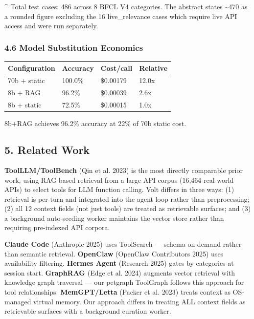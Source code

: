 \documentclass[
  10pt,
]{article}
\begin{document}
\^{} Total test cases: 486 across 8 BFCL V4 categories. The abstract
states \textasciitilde470 as a rounded figure excluding the 16
live\_relevance cases which require live API access and were run
separately.

\subsubsection{4.6 Model Substitution
Economics}\label{model-substitution-economics}

\begin{longtable}[]{@{}llll@{}}
\toprule\noalign{}
Configuration & Accuracy & Cost/call & Relative \\
\midrule\noalign{}
\endhead
\bottomrule\noalign{}
\endlastfoot
70b + static & 100.0\% & \$0.00179 & 12.0x \\
8b + RAG & 96.2\% & \$0.00039 & 2.6x \\
8b + static & 72.5\% & \$0.00015 & 1.0x \\
\end{longtable}

8b+RAG achieves 96.2\% accuracy at 22\% of 70b static cost.

\subsection{5. Related Work}\label{related-work}

\textbf{ToolLLM/ToolBench} (Qin et al. 2023) is the most directly
comparable prior work, using RAG-based retrieval from a large API corpus
(16,464 real-world APIs) to select tools for LLM function calling. Volt
differs in three ways: (1) retrieval is per-turn and integrated into the
agent loop rather than preprocessing; (2) all 12 context fields (not
just tools) are treated as retrievable surfaces; and (3) a background
auto-seeding worker maintains the vector store rather than requiring
pre-indexed API corpora.

\textbf{Claude Code} (Anthropic 2025) uses ToolSearch ---
schema-on-demand rather than semantic retrieval. \textbf{OpenClaw}
(OpenClaw Contributors 2025) uses availability filtering. \textbf{Hermes
Agent} (Research 2025) gates by categories at session start.
\textbf{GraphRAG} (Edge et al. 2024) augments vector retrieval with
knowledge graph traversal --- our petgraph ToolGraph follows this
approach for tool relationships. \textbf{MemGPT/Letta} (Packer et al.
2023) treats context as OS-managed virtual memory. Our approach differs
in treating ALL context fields as retrievable surfaces with a background
curation worker.
\end{document}
